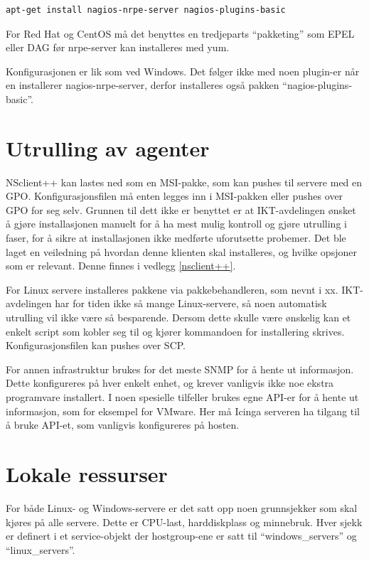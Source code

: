 \begin{lstlisting}
apt-get install nagios-nrpe-server nagios-plugins-basic
\end{lstlisting}

For Red Hat og CentOS må det benyttes en tredjeparts “pakketing” som EPEL eller DAG før nrpe-server kan installeres med yum.

Konfigurasjonen er lik som ved Windows. Det følger ikke med noen plugin-er når en installerer nagios-nrpe-server, derfor installeres også pakken “nagios-plugins-basic”.

\section{Utrulling av agenter}
NSclient++ kan lastes ned som en MSI-pakke, som kan pushes til servere med en GPO. Konfigurasjonsfilen må enten legges inn i MSI-pakken eller pushes over GPO for seg selv. Grunnen til dett ikke er benyttet er at IKT-avdelingen ønsket å gjøre installasjonen manuelt for å ha mest mulig kontroll og gjøre utrulling i faser, for å sikre at installasjonen ikke medførte uforutsette probemer. Det ble laget en veiledning på hvordan denne klienten skal installeres, og hvilke opsjoner som er relevant. Denne finnes i vedlegg \ref{nsclient++}.

For Linux servere installeres pakkene via pakkebehandleren, som nevnt i xx. IKT-avdelingen har for tiden ikke så mange Linux-servere, så noen automatisk utrulling vil ikke være så besparende. Dersom dette skulle være ønskelig kan et enkelt script som kobler seg til og kjører kommandoen for installering skrives. Konfigurasjonsfilen kan pushes over SCP.

For annen infrastruktur brukes for det meste SNMP for å hente ut informasjon. Dette konfigureres på hver enkelt enhet, og krever vanligvis ikke noe ekstra programvare installert. I noen spesielle tilfeller brukes egne API-er for å hente ut informasjon, som for eksempel for VMware. Her må Icinga serveren ha tilgang til å bruke API-et, som vanligvis konfigureres på hosten.

\section{Lokale ressurser}
For både Linux- og Windows-servere er det satt opp noen grunnsjekker som skal kjøres på alle servere. Dette er CPU-last, harddiskplass og minnebruk. Hver sjekk er definert i et service-objekt der hostgroup-ene er satt til “windows\_servers” og “linux\_servers”. 


